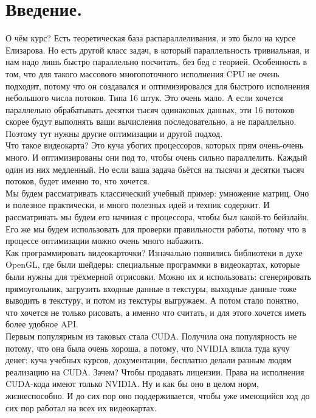 \documentclass{article}
\begin{document}
    \section{Введение.}
    О чём курс? Есть теоретическая база распараллеливания, и это было на курсе Елизарова. Но есть другой класс задач, в который параллельность тривиальная, и нам надо лишь быстро параллельно посчитать, без бед с теорией. Особенность в том, что для такого массового многопоточного исполнения CPU не очень подходит, потому что он создавался и оптимизировался для быстрого исполнения небольшого числа потоков. Типа 16 штук. Это очень мало. А если хочется параллельно обрабатывать десятки тысяч одинаковых данных, эти 16 потоков скорее будут выполнять ваши вычисления последовательно, а не параллельно. Поэтому тут нужны другие оптимизации и другой подход.\\
    Что такое видеокарта? Это куча убогих процессоров, которых прям очень-очень много. И оптимизированы они под то, чтобы очень сильно параллелить. Каждый один из них медленный. Но если ваша задача бьётся на тысячи и десятки тысяч потоков, будет именно то, что хочется.\\
    Мы будем рассматривать классический учебный пример: умножение матриц. Оно и полезное практически, и много полезных идей и техник содержит. И рассматривать мы будем его начиная с процессора, чтобы был какой-то бейзлайн. Его же мы будем использовать для проверки правильности работы, потому что в процессе оптимизации можно очень много набажить.\\
    Как программировать видеокарточки? Изначально появились библиотеки в духе OpenGL, где были шейдеры: специальные программки в видеокартах, которые были нужны для трёхмерной отрисовки. Можно их и использовать: сгенерировать прямоугольник, загрузить входные данные в текстуры, выходные данные тоже выводить в текстуру, и потом из текстуры выгружаем. А потом стало понятно, что хочется не только рисовать, а именно что считать, и для этого хочется иметь более удобное API.\\
    Первым популярным из таковых стала CUDA. Получила она популярность не потому, что она была очень хороша, а потому, что NVIDIA влила туда кучу денег: куча учебных курсов, документации, бесплатно делали разным людям реализацию на CUDA. Зачем? Чтобы продавать лицензии. Права на исполнения CUDA-кода имеют только NVIDIA. Ну и как бы оно в целом норм, жизнеспособно. И до сих пор оно поддерживается, чтобы уже имеющийся код до сих пор работал на всех их видеокартах.\\
\end{document}
